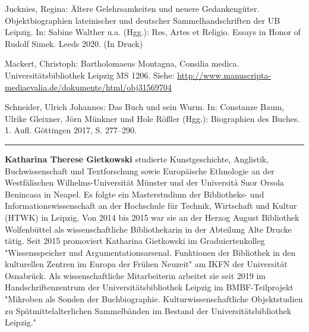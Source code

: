 \documentclass[a4paper,
fontsize=11pt,
oneside,
numbers=noperiodatend,
parskip=half-,
bibliography=totoc,
final
]{scrartcl}
\begin{document}
Jucknies, Regina: Ältere Gelehrsamkeiten und neuere Gedankengüter.
Objektbiographien lateinischer und deutscher Sammelhandschriften der UB
Leipzig. In: Sabine Walther u.a. (Hgg.): Res, Artes et Religio. Essays
in Honor of Rudolf Simek. Leeds 2020. (In Druck)

Mackert, Christoph: Bartholomaeus Montagna, Consilia medica.
Universitätsbibliothek Leipzig MS 1206. Siehe:
\url{http://www.manuscripta-mediaevalia.de/dokumente/html/obj31569704}

Schneider, Ulrich Johannes: Das Buch und sein Wurm. In: Constanze Baum,
Ulrike Gleixner, Jörn Münkner und Hole Rößler (Hgg.): Biographien des
Buches. 1. Aufl. Göttingen 2017, S. 277--290.

\begin{center}\rule{0.5\linewidth}{0.5pt}\end{center}

\textbf{Katharina Therese Gietkowski} studierte Kunstgeschichte,
Anglistik, Buchwissenschaft und Textforschung sowie Europäische
Ethnologie an der Westfälischen Wilhelms-Universität Münster und der
Università Suor Orsola Benincasa in Neapel. Es folgte ein Masterstudium
der Bibli\-otheks- und Informationswissenschaft an der Hochschule für
Technik, Wirtschaft und Kultur (HTWK) in Leipzig. Von 2014 bis 2015 war
sie an der Herzog August Bibliothek Wolfenbüttel als wissenschaftliche
Bibliothekarin in der Abteilung Alte Drucke tätig. Seit 2015 promoviert
Katharina Gietkowski im Graduiertenkolleg "Wissensspeicher und
Argumentationsarsenal. Funktionen der Bibliothek in den kulturellen
Zentren im Europa der Frühen Neuzeit" am IKFN der Universität
Osnabrück. Als wissenschaftliche Mitarbeiterin arbeitet sie seit 2019 im
Handschriftenzentrum der Universitätsbibliothek Leipzig im
BMBF-Teilprojekt "Mikroben als Sonden der
Buchbiographie. Kulturwissenschaftliche Objektstudien zu
Spätmittelalterlichen Sammelbänden im Bestand der Universitätsbibliothek
Leipzig."
\end{document}
